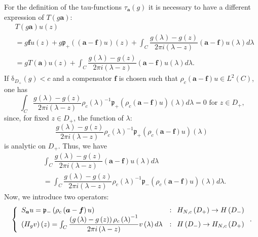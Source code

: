 \documentclass[a4paper]{article}%
\begin{document}
For the definition of the tau-functions $\tau_{\boldsymbol{a}}\left(
g\right)  $ it is necessary to have a different expression of $T\left(
g\boldsymbol{a}\right)  $:
\begin{align*}
&  T\left(  g\boldsymbol{a}\right)  u\left(  z\right) \\
&  =g\boldsymbol{f}u\left(  z\right)  +g\mathfrak{p}_{+}\left(  \left(
\boldsymbol{a}-\boldsymbol{f}\right)  u\right)  \left(  z\right)  +\int
_{C}\dfrac{g\left(  \lambda\right)  -g\left(  z\right)  }{2\pi i\left(
\lambda-z\right)  }\left(  \boldsymbol{a}-\boldsymbol{f}\right)  u\left(
\lambda\right)  d\lambda\\
&  =gT\left(  \boldsymbol{a}\right)  u\left(  z\right)  +\int_{C}%
\dfrac{g\left(  \lambda\right)  -g\left(  z\right)  }{2\pi i\left(
\lambda-z\right)  }\left(  \boldsymbol{a}-\boldsymbol{f}\right)  u\left(
\lambda\right)  d\lambda\text{.}%
\end{align*}
If $\mathrm{\delta}_{D_{+}}\left(  g\right)  <c$ and a compensator
$\boldsymbol{f}$ is chosen such that $\rho_{c}\left(  \boldsymbol{a}%
-\boldsymbol{f}\right)  u\in L^{2}\left(  C\right)  $, one has
\[
\int_{C}\dfrac{g\left(  \lambda\right)  -g\left(  z\right)  }{2\pi i\left(
\lambda-z\right)  }\rho_{c}\left(  \lambda\right)  ^{-1}\mathfrak{p}%
_{+}\left(  \rho_{c}\left(  \boldsymbol{a}-\boldsymbol{f}\right)  u\right)
\left(  \lambda\right)  d\lambda=0\text{ \ for }z\in D_{+}\text{,}%
\]
since, for fixed $z\in D_{+}$, the function of $\lambda$:%
\[
\dfrac{g\left(  \lambda\right)  -g\left(  z\right)  }{2\pi i\left(
\lambda-z\right)  }\rho_{c}\left(  \lambda\right)  ^{-1}\mathfrak{p}%
_{+}\left(  \rho_{c}\left(  \boldsymbol{a}-\boldsymbol{f}\right)  u\right)
\left(  \lambda\right)
\]
is analytic on $D_{+}$. Thus, we have%
\begin{align}
&  \int_{C}\dfrac{g\left(  \lambda\right)  -g\left(  z\right)  }{2\pi i\left(
\lambda-z\right)  }\left(  \boldsymbol{a}-\boldsymbol{f}\right)  u\left(
\lambda\right)  d\lambda\nonumber\\
&  =\int_{C}\dfrac{g\left(  \lambda\right)  -g\left(  z\right)  }{2\pi
i\left(  \lambda-z\right)  }\rho_{c}\left(  \lambda\right)  ^{-1}%
\mathfrak{p}_{-}\left(  \rho_{c}\left(  \boldsymbol{a}-\boldsymbol{f}\right)
u\right)  \left(  \lambda\right)  d\lambda\text{.} \label{2-6}%
\end{align}
Now, we introduce two operators:
\begin{equation}
\left\{
\begin{array}
[c]{ll}%
S_{\boldsymbol{a}}u=\mathfrak{p}_{-}\left(  \rho_{c}\left(  \boldsymbol{a}%
-\boldsymbol{f}\right)  u\right)  & \text{: \ }H_{N,c}\left(  D_{+}\right)
\rightarrow H\left(  D_{-}\right) \\
\left(  H_{g}v\right)  \left(  z\right)  =\int_{C}\dfrac{\left(  g\left(
\lambda\right)  -g\left(  z\right)  \right)  \rho_{c}\left(  \lambda\right)
^{-1}}{2\pi i\left(  \lambda-z\right)  }v\left(  \lambda\right)  d\lambda &
\text{: \ }H\left(  D_{-}\right)  \rightarrow H_{N,c}\left(  D_{+}\right)
\end{array}
\right.  \text{.} \label{2-7}%
\end{equation}
\end{document}

